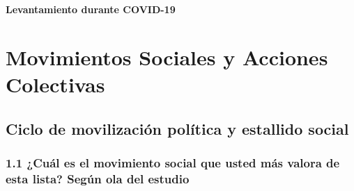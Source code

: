 \documentclass[
  12pt,
]{book}
\begin{document}
\textbf{Levantamiento durante COVID-19}

\hypertarget{movimientos-sociales-y-acciones-colectivas}{%
\chapter{Movimientos Sociales y Acciones Colectivas}\label{movimientos-sociales-y-acciones-colectivas}}

\hypertarget{ciclo-de-movilizaciuxf3n-poluxedtica-y-estallido-social}{%
\section{Ciclo de movilización política y estallido social}\label{ciclo-de-movilizaciuxf3n-poluxedtica-y-estallido-social}}

\hypertarget{cuuxe1l-es-el-movimiento-social-que-usted-muxe1s-valora-de-esta-lista-seguxfan-ola-del-estudio}{%
\subsection{1.1 ¿Cuál es el movimiento social que usted más valora de esta lista? Según ola del estudio}\label{cuuxe1l-es-el-movimiento-social-que-usted-muxe1s-valora-de-esta-lista-seguxfan-ola-del-estudio}}
\end{document}

